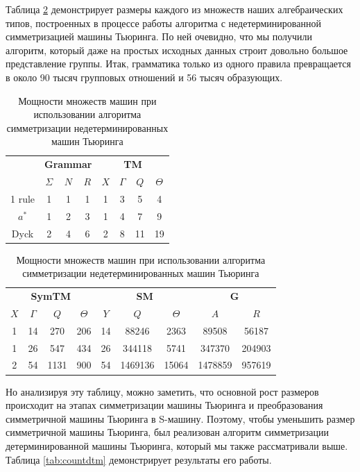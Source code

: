 \documentclass[14pt]{matmex-diploma-custom}
\begin{document}
Таблица \ref{tab:countndtm} демонстрирует размеры каждого из множеств наших алгебраических типов, построенных в процессе работы алгоритма с недетерминированной симметризацией машины Тьюринга. По ней очевидно, что мы получили алгоритм, который даже на простых исходных данных строит довольно большое представление группы. Итак, грамматика только из одного правила превращается в около 90 тысяч групповых отношений и 56 тысяч образующих. 

\begin{table}[H]
\centering
\begin{tabular}{|c|
c|c|c|
c|c|c|c|}
\hline
&
\multicolumn{3}{|c|}{\textbf{Grammar}}&
\multicolumn{4}{|c|}{\textbf{TM}}\\
\cline{2-8}
&$\Sigma$&$N$&$R$
&$X$&$\Gamma$&$Q$&$\Theta$\\
\hline
1 rule
&1&1&1
&1&3&5&4\\
\hline
$a^*$
&1&2&3
&1&4&7&9\\
\hline
Dyck
&2&4&6
&2&8&11&19\\
\hline
\end{tabular}
\begin{tabular}{
|c|c|c|c|
c|c|c|
c|c|}
\hline
\multicolumn{4}{|c|}{\textbf{SymTM}}&
\multicolumn{3}{|c|}{\textbf{SM}}&
\multicolumn{2}{|c|}{\textbf{G}}\\
\cline{1-9}
$X$&$\Gamma$&$Q$&$\Theta$
&$Y$&$Q$&$\Theta$
&$A$&$R$\\
\hline
1&14&270&206
&14&88246&2363
&89508&56187\\
\hline
1&26&547&434
&26&344118&5741
&347370&204903\\
\hline
2&54&1131&900
&54&1469136&15064
&1478859&957619\\
\hline
\end{tabular}
\caption{Мощности множеств машин при использовании алгоритма симметризации недетерминированных машин Тьюринга}
\label{tab:countndtm}
\end{table}


Но анализируя эту таблицу, можно заметить, что основной рост размеров происходит на этапах симметризации машины Тьюринга и преобразования симметричной машины Тьюринга в S-машину. Поэтому, чтобы уменьшить размер симметричной машины Тьюринга, был реализован алгоритм симметризации детерминированной машины Тьюринга, который мы также рассматривали выше. Таблица \ref{tab:countdtm} демонстрирует результаты его работы. 
\end{document}
